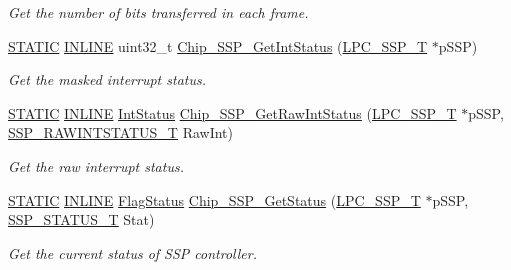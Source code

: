 \begin{DoxyCompactItemize}
\begin{DoxyCompactList}\small\item\em Get the number of bits transferred in each frame. \end{DoxyCompactList}\item 
\hyperlink{group__LPC__Types__Public__Macros_ga10b2d890d871e1489bb02b7e70d9bdfb}{S\+T\+A\+T\+IC} \hyperlink{group__LPC__Types__Public__Types_ga2eb6f9e0395b47b8d5e3eeae4fe0c116}{I\+N\+L\+I\+NE} uint32\+\_\+t \hyperlink{group__SSP__17XX__40XX_ga207244e33021333a66bb04f2bd2f1102}{Chip\+\_\+\+S\+S\+P\+\_\+\+Get\+Int\+Status} (\hyperlink{structLPC__SSP__T}{L\+P\+C\+\_\+\+S\+S\+P\+\_\+T} $\ast$p\+S\+SP)
\begin{DoxyCompactList}\small\item\em Get the masked interrupt status. \end{DoxyCompactList}\item 
\hyperlink{group__LPC__Types__Public__Macros_ga10b2d890d871e1489bb02b7e70d9bdfb}{S\+T\+A\+T\+IC} \hyperlink{group__LPC__Types__Public__Types_ga2eb6f9e0395b47b8d5e3eeae4fe0c116}{I\+N\+L\+I\+NE} \hyperlink{group__LPC__Types__Public__Types_gab7d263072f745b4f3913fb0afc434c4e}{Int\+Status} \hyperlink{group__SSP__17XX__40XX_ga0cc48f6c5bea491f2965b5b6fd0dcf69}{Chip\+\_\+\+S\+S\+P\+\_\+\+Get\+Raw\+Int\+Status} (\hyperlink{structLPC__SSP__T}{L\+P\+C\+\_\+\+S\+S\+P\+\_\+T} $\ast$p\+S\+SP, \hyperlink{group__SSP__17XX__40XX_gaf901cb9befcf9302650fed7f1ddba443}{S\+S\+P\+\_\+\+R\+A\+W\+I\+N\+T\+S\+T\+A\+T\+U\+S\+\_\+T} Raw\+Int)
\begin{DoxyCompactList}\small\item\em Get the raw interrupt status. \end{DoxyCompactList}\item 
\hyperlink{group__LPC__Types__Public__Macros_ga10b2d890d871e1489bb02b7e70d9bdfb}{S\+T\+A\+T\+IC} \hyperlink{group__LPC__Types__Public__Types_ga2eb6f9e0395b47b8d5e3eeae4fe0c116}{I\+N\+L\+I\+NE} \hyperlink{group__LPC__Types__Public__Types_ga89136caac2e14c55151f527ac02daaff}{Flag\+Status} \hyperlink{group__SSP__17XX__40XX_ga82dd278bcdbd80eaacc43abc211a970f}{Chip\+\_\+\+S\+S\+P\+\_\+\+Get\+Status} (\hyperlink{structLPC__SSP__T}{L\+P\+C\+\_\+\+S\+S\+P\+\_\+T} $\ast$p\+S\+SP, \hyperlink{group__SSP__17XX__40XX_gad95eaf4325a2ec8e457b309d21d6987d}{S\+S\+P\+\_\+\+S\+T\+A\+T\+U\+S\+\_\+T} Stat)
\begin{DoxyCompactList}\small\item\em Get the current status of S\+SP controller. \end{DoxyCompactList}\item 

\end{DoxyCompactItemize}
